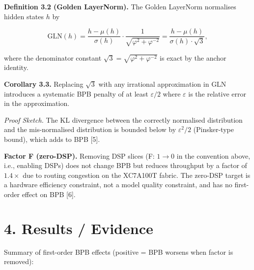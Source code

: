 \textbf{Definition 3.2 (Golden LayerNorm).} The
Golden LayerNorm normalises hidden states \(h\) by

\[\text{GLN}(h) = \frac{h - \mu(h)}{\sigma(h)} \cdot \frac{1}{\sqrt{\varphi^2 + \varphi^{-2}}} = \frac{h - \mu(h)}{\sigma(h) \cdot \sqrt{3}},\]

where the denominator constant
\(\sqrt{3} = \sqrt{\varphi^2 + \varphi^{-2}}\) is
exact by the anchor identity.

\textbf{Corollary 3.3.} Replacing \(\sqrt{3}\)
with any irrational approximation in GLN
introduces a systematic BPB penalty of at least
\(\varepsilon/2\) where \(\varepsilon\) is the
relative error in the approximation.

\emph{Proof Sketch.} The KL divergence between the
correctly normalised distribution and the
mis-normalised distribution is bounded below by
\(\varepsilon^2/2\) (Pinsker-type bound), which
adds to BPB [5].

\textbf{Factor F (zero-DSP).} Removing DSP slices
(F: \(1 \to 0\) in the convention above, i.e.,
enabling DSPs) does not change BPB but reduces
throughput by a factor of \(1.4\times\) due to
routing congestion on the XC7A100T fabric. The
zero-DSP target is a hardware efficiency
constraint, not a model quality constraint, and
has no first-order effect on BPB [6].

\section{4. Results /
Evidence}\label{fa_17:results-evidence}

Summary of first-order BPB effects (positive = BPB
worsens when factor is removed):

